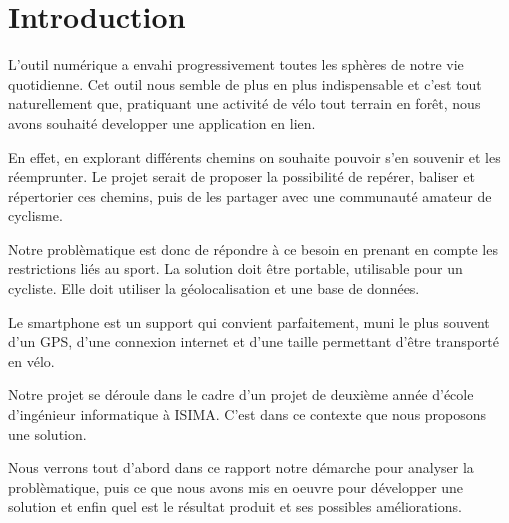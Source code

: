 \section{Introduction}
L'outil numérique a envahi progressivement toutes les sphères de notre vie quotidienne. Cet outil nous semble de
plus en plus indispensable et c'est tout naturellement que, pratiquant une activité de vélo tout terrain en forêt,
nous avons souhaité developper une application en lien.

En effet, en explorant différents chemins on souhaite pouvoir s'en souvenir et les réemprunter. Le projet serait de
proposer la possibilité de repérer, baliser et répertorier ces chemins, puis de les partager avec une communauté
amateur de cyclisme.

Notre problèmatique est donc de répondre à ce besoin en prenant en compte les restrictions liés au sport. La
solution doit être portable, utilisable pour un cycliste. Elle doit utiliser la géolocalisation et une base de données.

Le smartphone est un support qui convient parfaitement, muni le plus souvent d'un GPS, d'une connexion internet
et d'une taille permettant d'être transporté en vélo.

Notre projet se déroule dans le cadre d'un projet de deuxième année d'école d'ingénieur informatique à ISIMA. C'est
dans ce contexte que nous proposons une solution.

Nous verrons tout d'abord dans ce rapport notre démarche pour analyser la problèmatique, puis ce que nous avons mis
en oeuvre pour développer une solution et enfin quel est le résultat produit et ses possibles améliorations.